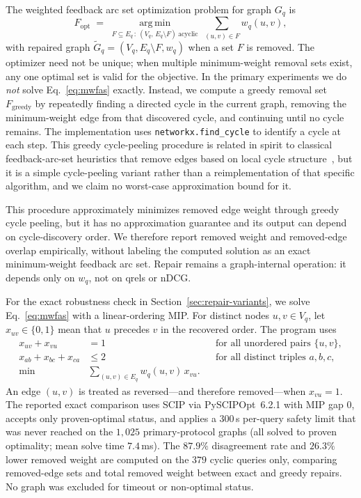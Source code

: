 \documentclass[manuscript,anonymous,review]{acmart}
\begin{document}
The weighted feedback arc set optimization problem for graph $G_q$ is
\begin{equation}
  F_{\mathrm{opt}} \;=\; \operatorname*{arg\,min}_{F \subseteq E_q \,:\ (V_q,\, E_q\setminus F)\ \text{acyclic}} \ \sum_{(u,v)\in F} w_q(u,v),
  \label{eq:mwfas}
\end{equation}
with repaired graph $\widetilde G_q = (V_q, E_q \setminus F, w_q)$ when a set
$F$ is removed. The optimizer need not be unique; when multiple minimum-weight
removal sets exist, any one optimal set is valid for the objective. In the
primary experiments we do \emph{not} solve Eq.~\eqref{eq:mwfas} exactly.
Instead, we compute a greedy removal set $F_{\mathrm{greedy}}$ by repeatedly
finding a directed cycle in the current graph, removing the minimum-weight edge
from that discovered cycle, and continuing until no cycle remains. The
implementation uses \texttt{networkx.find\_cycle} to identify a cycle at each
step. This greedy cycle-peeling procedure is related in spirit to classical
feedback-arc-set heuristics that remove edges based on local cycle
structure~\cite{eades1993heuristic}, but it is a simple cycle-peeling variant
rather than a reimplementation of that specific algorithm, and we claim no
worst-case approximation bound for it.

This procedure approximately minimizes removed edge weight through greedy cycle
peeling, but it has no approximation guarantee and its output can depend on
cycle-discovery order. We therefore report removed weight and removed-edge
overlap empirically, without labeling the computed solution as an exact
minimum-weight feedback arc set. Repair remains a graph-internal operation: it
depends only on $w_q$, not on qrels or nDCG.

For the exact robustness check in Section~\ref{sec:repair-variants}, we solve
Eq.~\eqref{eq:mwfas} with a linear-ordering MIP. For distinct nodes $u,v\in V_q$,
let $x_{uv}\in\{0,1\}$ mean that $u$ precedes $v$ in the recovered order. The
program uses
\begin{align}
  x_{uv}+x_{vu}&=1
  &&\text{for all unordered pairs }\{u,v\},
  \label{eq:ilp-anti}\\
  x_{ab}+x_{bc}+x_{ca}&\le 2
  &&\text{for all distinct triples }a,b,c,
  \label{eq:ilp-trans}\\
  \min &\sum_{(u,v)\in E_q} w_q(u,v)\,x_{vu}.
  \label{eq:ilp-obj}
\end{align}
An edge $(u,v)$ is treated as reversed---and therefore removed---when
$x_{vu}=1$. The reported exact comparison uses SCIP via PySCIPOpt~6.2.1 with
MIP gap $0$, accepts only proven-optimal status, and applies a $300$\,s
per-query safety limit that was never reached on the $1{,}025$ primary-protocol
graphs (all solved to proven optimality; mean solve time $7.4$\,ms). The
$87.9\%$ disagreement rate and $26.3\%$ lower removed weight are computed on
the $379$ cyclic queries only, comparing removed-edge sets and total removed
weight between exact and greedy repairs. No graph was excluded for timeout or
non-optimal status.
\end{document}
